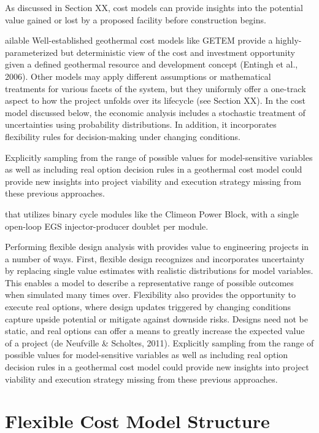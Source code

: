 As discussed in Section XX, cost models can provide insights into the potential value gained or lost by a proposed facility before construction begins.

ailable 
Well-established geothermal cost models like GETEM provide a highly-parameterized but deterministic view of the cost and investment opportunity given a defined geothermal resource and development concept (Entingh et al., 2006). Other models may apply different assumptions or mathematical treatments for various facets of the system, but they uniformly offer a one-track aspect to how the project unfolds over its lifecycle (see Section XX). In the cost model discussed below, the economic analysis includes a stochastic treatment of uncertainties using probability distributions. In addition, it incorporates flexibility rules for decision-making under changing conditions.  


Explicitly sampling from the range of possible values for model-sensitive variables as well as including real option decision rules in a geothermal cost model could provide new insights into project viability and execution strategy missing from these previous approaches.

that utilizes binary cycle modules like the Climeon Power Block, with a single open-loop EGS injector-producer doublet per module. 



Performing flexible design analysis with provides value to engineering projects in a number of ways. First, flexible design recognizes and incorporates uncertainty by replacing single value estimates with realistic distributions for model variables. This enables a model to describe a representative range of possible outcomes when simulated many times over. Flexibility also provides the opportunity to execute real options, where design updates triggered by changing conditions capture upside potential or mitigate against downside risks. Designs need not be static, and real options can offer a means to greatly increase the expected value of a project (de Neufville \& Scholtes, 2011).
 Explicitly sampling from the range of possible values for model-sensitive variables as well as including real option decision rules in a geothermal cost model could provide new insights into project viability and execution strategy missing from these previous approaches.




\section{Flexible Cost Model Structure}\label{ch4:cm_structure}

